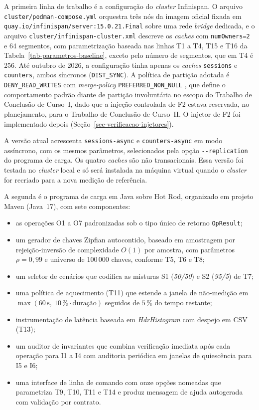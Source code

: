 A primeira linha de trabalho é a configuração do \emph{cluster} Infinispan. O arquivo \texttt{cluster/podman-compose.yml} orquestra três nós da imagem oficial fixada em \texttt{quay.io/infinispan/server:15.0.21.Final} sobre uma rede \emph{bridge} dedicada, e o arquivo \texttt{cluster/infinispan-cluster.xml} descreve os \emph{caches} com \texttt{numOwners=2} e 64 segmentos, com parametrização baseada nas linhas T1 a T4, T15 e T16 da Tabela~\ref{tab-parametros-baseline}, exceto pelo número de segmentos, que em T4 é 256. Até outubro de 2026, a configuração tinha apenas os \emph{caches} \texttt{sessions} e \texttt{counters}, ambos síncronos (\texttt{DIST\_SYNC}). A política de partição adotada é \texttt{DENY\_READ\_WRITES} com \emph{merge-policy} \texttt{PREFERRED\_NON\_NULL} \cite[seção 7]{infinispan_configuring_15}, que define o comportamento padrão diante de partição involuntária no escopo do Trabalho de Conclusão de Curso~I, dado que a injeção controlada de F2 estava reservada, no planejamento, para o Trabalho de Conclusão de Curso~II. O injetor de F2 foi implementado depois (Seção~\ref{sec-verificacao-injetores}).

A versão atual acrescenta \texttt{sessions-async} e \texttt{counters-async} em modo assíncrono, com os mesmos parâmetros, selecionados pela opção \texttt{-{}-replication} do programa de carga. Os quatro \emph{caches} são não transacionais. Essa versão foi testada no \emph{cluster} local e só será instalada na máquina virtual quando o \emph{cluster} for recriado para a nova medição de referência.

A segunda é o programa de carga em Java sobre Hot Rod, organizado em projeto Maven \citep{maven_apache} (Java~17), com sete componentes:

\begin{itemize}
    \item as operações O1 a O7 padronizadas sob o tipo único de retorno \texttt{OpResult};
    \item um gerador de chaves Zipfian autocontido, baseado em amostragem por rejeição-inversão de complexidade $O(1)$ por amostra, com parâmetros $\rho = 0{,}99$ e universo de $100\,000$ chaves, conforme T5, T6 e T8;
    \item um seletor de cenários que codifica as misturas S1 (\emph{50/50}) e S2 (\emph{95/5}) de T7;
    \item uma política de aquecimento (T11) que estende a janela de não-medição em $\max(60\,\text{s},\ 10\,\% \cdot \text{duração})$ seguidos de $5\,\%$ do tempo restante;
    \item instrumentação de latência baseada em \emph{HdrHistogram} \citep{hdrhistogram} com despejo em CSV (T13);
    \item um auditor de invariantes que combina verificação imediata após cada operação para I1 a I4 com auditoria periódica em janelas de quiescência para I5 e I6;
    \item uma interface de linha de comando com onze opções nomeadas que parametriza T9, T10, T11 e T14 e produz mensagem de ajuda autogerada com validação por contrato.
\end{itemize}


